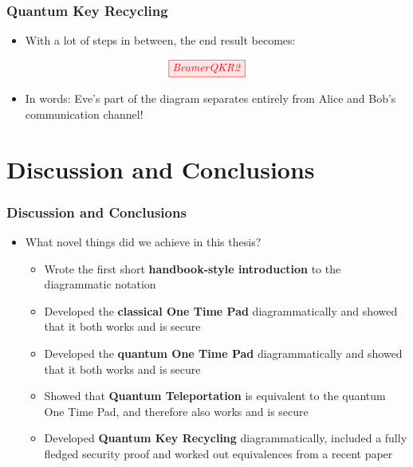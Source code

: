 \documentclass[]{beamer}
\begin{document}
\begin{frame}
	\frametitle{Quantum Key Recycling}
	\begin{itemize}
		\item With a lot of steps in between, the end result becomes:
		\vspace{0.5cm}
	\end{itemize}
	\begin{equation}
	\tikzfig{BeamerQKR2}
	\end{equation}
		\begin{itemize}
		\item In words: Eve's part of the diagram separates entirely from Alice and Bob's communication channel!
	\end{itemize}
\end{frame}
\begin{frame}
	\centering 
	\Huge
\end{frame}
\section{Discussion and Conclusions}
\begin{frame}
	\frametitle{Discussion and Conclusions}
	\begin{itemize}
		\item What novel things did we achieve in this thesis?\pause
		\begin{itemize}
			\item Wrote the first short \textbf{handbook-style introduction} to the diagrammatic notation\pause
			\item Developed the \textbf{classical One Time Pad} diagrammatically and showed that it both works and is secure\pause
			\item Developed the \textbf{quantum One Time Pad} diagrammatically and showed that it both works and is secure\pause
			\item Showed that \textbf{Quantum Teleportation} is equivalent to the quantum One Time Pad, and therefore also works and is secure\pause
			\item Developed \textbf{Quantum Key Recycling} diagrammatically, included a fully fledged security proof and worked out equivalences from a recent paper 
		\end{itemize}
	\end{itemize}
\end{frame}
\end{document}
